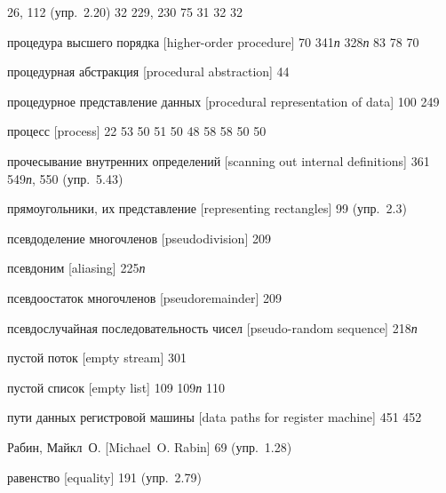 \begin{theindex}
   26, 112 (упр.~2.20)
   32
   229, 230
   75
   31
   32
   32
\item {процедура высшего порядка [higher-order procedure]} 70
   341{\it п}
   328{\it п}
   83
   78
   70
\item {процедурная абстракция [procedural abstraction]} 44
\item {процедурное представление данных [procedural representation of data]} 100
   249
\item {процесс [process]} 22
   53
   50
   51
   50
   48
   58
   58
   50
   50
\item {прочесывание внутренних определений [scanning out internal definitions]} 361
   549{\it п}, 550 (упр.~5.43)
\item {прямоугольники, их представление [representing rectangles]} 99 (упр.~2.3)
\item {псевдоделение многочленов [pseudodivision]} 209
\item {псевдоним [aliasing]} 225{\it п}
\item {псевдоостаток многочленов [pseudoremainder]} 209
\item {псевдослучайная последовательность чисел [pseudo-random sequence]} 218{\it п}
\item {пустой поток [empty stream]} 301
\item {пустой список [empty list]} 109
   109{\it п}
   110
\item {пути данных регистровой машины [data paths for register machine]} 451
   452
\bigskip
\item {Рабин, Майкл~О. [Michael~O. Rabin]} 69 (упр.~1.28)
\item {равенство [equality]}
   191 (упр.~2.79)

\end{theindex}
